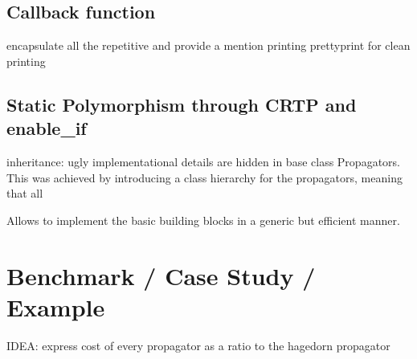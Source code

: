 




\usepackage{tikz}
\usetikzlibrary{arrows,chains,matrix,positioning,scopes}











\clearemptydoublepage

\mbox{}
\vfill

\vfill
\tableofcontents

\clearpage

\listoffigures
\listofalgorithms

\clearemptydoublepage 
\clearpage 
\clearpage 
\clearpage 







\clearpage 

\subsection{Callback function}
\label{subsec:callback}
encapsulate all the repetitive 
and provide a
mention printing
prettyprint for clean printing


\subsection{Static Polymorphism through CRTP and enable\_if}
\label{subsec:poly}
inheritance: ugly implementational details are hidden in base class Propagators.
This was achieved by introducing a class hierarchy for the propagators, meaning that all 
\cite{C_CRTP}

Allows to implement the basic building blocks in a generic but efficient manner.







\clearpage
\section{Benchmark / Case Study / Example}

IDEA: express cost of every propagator as a ratio to the hagedorn propagator

